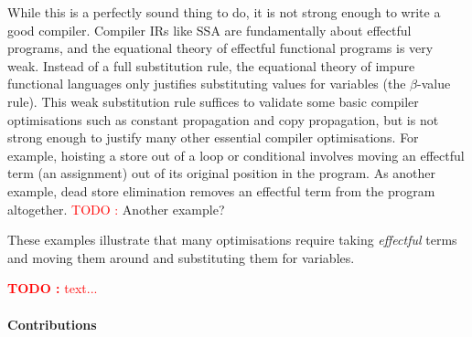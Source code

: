 \documentclass[acmsmall,screen,review]{acmart}
\newcounter{todos}
\newcommand{\TODO}[1]{{
  \stepcounter{todos}
  \begin{center}\large{\textcolor{red}{\textbf{TODO \arabic{todos}:} #1}}\end{center}
}}
\newcommand{\todo}[1]{\stepcounter{todos} \textcolor{red}{TODO \arabic{todos}:} #1}
\begin{document}
While this is a perfectly sound thing to do, it is not strong enough
to write a good compiler. Compiler IRs like SSA are fundamentally
about effectful programs, and the equational theory of effectful
functional programs is very weak. Instead of a full substitution rule,
the equational theory of impure functional languages only justifies
substituting values for variables (the $\beta$-value rule). This weak
substitution rule suffices to validate some basic compiler
optimisations such as constant propagation and copy propagation, but
is not strong enough to justify many other essential compiler
optimisations. For example, hoisting a store out of a loop or
conditional involves moving an effectful term (an assignment) out of
its original position in the program. As another example, dead store
elimination removes an effectful term from the program altogether. \todo{Another example?}

These examples illustrate that many optimisations require taking
\emph{effectful} terms and moving them around and substituting them
for variables.







% 
% 
\TODO{text...}

\paragraph{Contributions}
\end{document}
